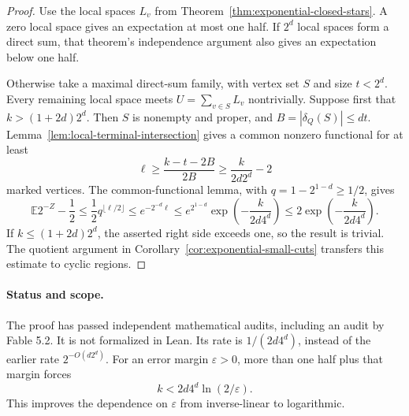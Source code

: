 \begin{proof}
Use the local spaces $L_v$ from Theorem~\ref{thm:exponential-closed-stars}.
A zero local space gives an expectation at most one half.
If $2^d$ local spaces form a direct sum, that theorem's independence argument also gives an expectation below one half.

Otherwise take a maximal direct-sum family, with vertex set $S$ and size $t<2^d$.
Every remaining local space meets $U=\sum_{v\in S}L_v$ nontrivially.
Suppose first that $k>(1+2d)2^d$.
Then $S$ is nonempty and proper, and $B=|\delta_Q(S)|\le dt$.
Lemma~\ref{lem:local-terminal-intersection} gives a common nonzero functional for at least
\[
 \ell\ge\frac{k-t-2B}{2B}
 \ge\frac{k}{2d2^d}-2
\]
marked vertices.
The common-functional lemma, with $q=1-2^{1-d}\ge1/2$, gives
\[
 \mathbb E2^{-Z}-\frac12
 \le\frac12q^{\lfloor\ell/2\rfloor}
 \le e^{-2^{-d}\ell}
 \le e^{2^{1-d}}\exp\!\left(-\frac{k}{2d4^d}\right)
 \le2\exp\!\left(-\frac{k}{2d4^d}\right).
\]
If $k\le(1+2d)2^d$, the asserted right side exceeds one, so the result is trivial.
The quotient argument in Corollary~\ref{cor:exponential-small-cuts} transfers this estimate to cyclic regions.
\end{proof}

\paragraph{Status and scope.}
The proof has passed independent mathematical audits, including an audit by Fable 5.2.
It is not formalized in Lean.
Its rate is $1/(2d4^d)$, instead of the earlier rate $2^{-O(d2^d)}$.
For an error margin $\varepsilon>0$, more than one half plus that margin forces
\[
 k<2d4^d\ln(2/\varepsilon).
\]
This improves the dependence on $\varepsilon$ from inverse-linear to logarithmic.
